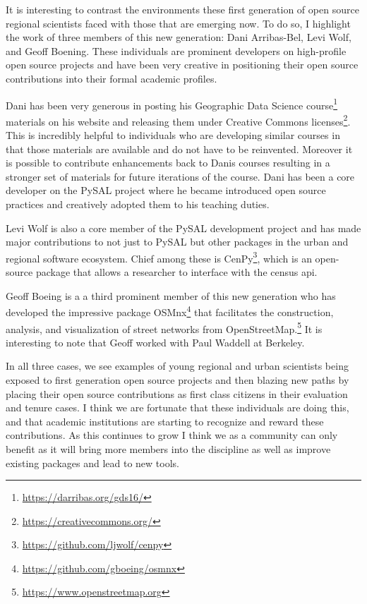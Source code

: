 \documentclass[11pt]{article}
\begin{document}
It is interesting to contrast the environments these first generation of open
source regional scientists faced with those that are emerging now. To do so, I
highlight the work of three members of this new generation: Dani Arribas-Bel,
Levi Wolf, and Geoff Boening. These individuals are prominent developers on
high-profile open source projects and have been very creative in positioning
their open source contributions into their formal academic profiles.

Dani has been very generous in posting his Geographic Data Science course\footnote{\url{https://darribas.org/gds16/}}
materials on his website and releasing them under Creative Commons
licenses\footnote{\url{https://creativecommons.org/}}.  This is incredibly helpful to individuals who are developing
similar courses in that those materials are available and do not have to be
reinvented. Moreover it is possible to contribute enhancements back to Danis
courses resulting in a stronger set of materials for future iterations of the
course. Dani has been a core developer on the PySAL project where he became
introduced open source practices and creatively adopted them to his teaching
duties.


Levi Wolf is also a core member of the PySAL development project and has made
major contributions to not just to PySAL but other packages in the urban and
regional software ecosystem. Chief among these is CenPy\footnote{\url{https://github.com/ljwolf/cenpy}}, which is an
open-source package that allows a researcher to interface with the census api.

Geoff Boeing is a a third prominent member of this new generation who has
developed the impressive package OSMnx\footnote{\url{https://github.com/gboeing/osmnx}} that facilitates the
construction, analysis, and visualization of street networks from
OpenStreetMap.\footnote{\url{https://www.openstreetmap.org}} It is interesting to note that Geoff worked with Paul
Waddell at Berkeley.

In all three cases, we see examples of young regional and urban scientists
being exposed to first generation open source projects and then blazing new
paths by placing their open source contributions as first class citizens in
their evaluation and tenure cases. I think we are fortunate that these
individuals are doing this, and that academic institutions are starting to
recognize and reward these contributions. As this continues to grow I think we
as a community can only benefit as it will bring more members into the
discipline as well as improve existing packages and lead to new tools.
\end{document}
